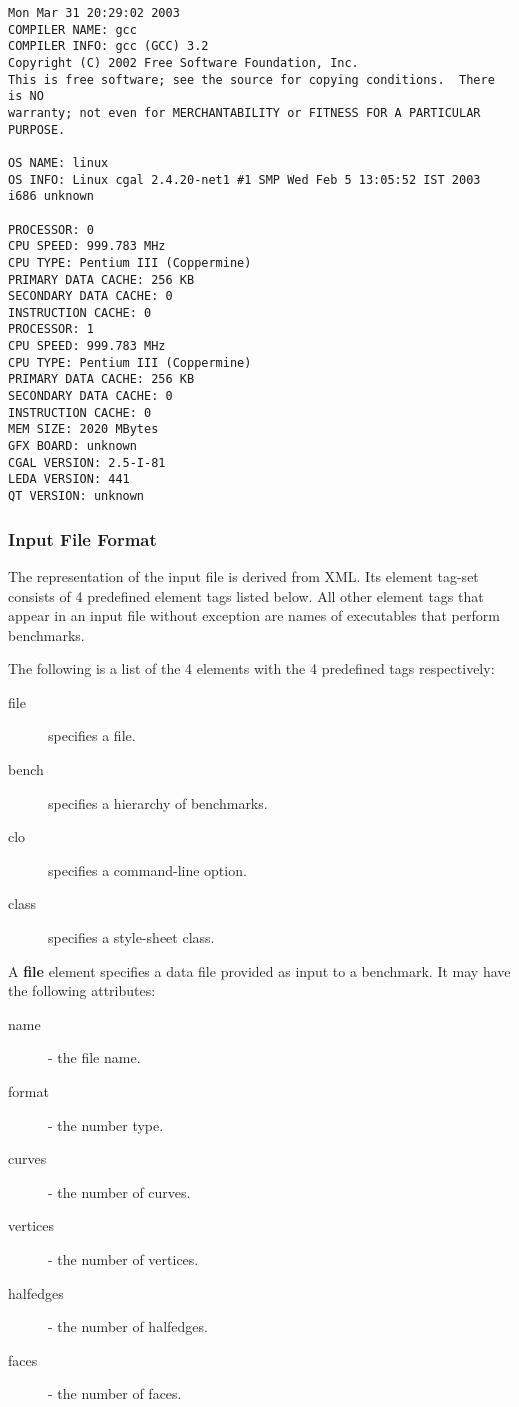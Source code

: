 \begin{verbatim}
Mon Mar 31 20:29:02 2003
COMPILER NAME: gcc
COMPILER INFO: gcc (GCC) 3.2
Copyright (C) 2002 Free Software Foundation, Inc.
This is free software; see the source for copying conditions.  There is NO
warranty; not even for MERCHANTABILITY or FITNESS FOR A PARTICULAR PURPOSE.

OS NAME: linux
OS INFO: Linux cgal 2.4.20-net1 #1 SMP Wed Feb 5 13:05:52 IST 2003 i686 unknown

PROCESSOR: 0
CPU SPEED: 999.783 MHz
CPU TYPE: Pentium III (Coppermine)
PRIMARY DATA CACHE: 256 KB
SECONDARY DATA CACHE: 0
INSTRUCTION CACHE: 0
PROCESSOR: 1
CPU SPEED: 999.783 MHz
CPU TYPE: Pentium III (Coppermine)
PRIMARY DATA CACHE: 256 KB
SECONDARY DATA CACHE: 0
INSTRUCTION CACHE: 0
MEM SIZE: 2020 MBytes
GFX BOARD: unknown
CGAL VERSION: 2.5-I-81
LEDA VERSION: 441
QT VERSION: unknown
\end{verbatim}

\subsubsection{Input File Format}
The representation of the input file is derived from XML. Its element
tag-set consists of 4 predefined element tags listed below. All other
element tags that appear in an input file without exception are names
of executables that perform benchmarks.

The following is a list of the 4 elements with the 4 predefined tags
respectively:
\begin{description}
\item[file] specifies a file.
\item[bench] specifies a hierarchy of benchmarks.
\item[clo] specifies a command-line option.
\item[class] specifies a style-sheet class.
\end{description}

A \textbf{file} element specifies a data file provided as input to a
benchmark. It may have the following attributes:
\begin{description}
\item[name] - the file name.
\item[format] - the number type.
\item[curves] - the number of curves.
\item[vertices] - the number of vertices.
\item[halfedges] - the number of halfedges.
\item[faces] - the number of faces.
\end{description}

